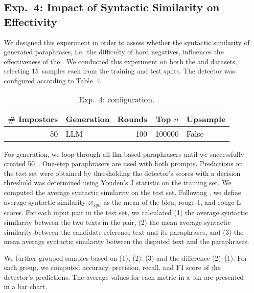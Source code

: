 \subsection{Exp.\ 4: Impact of Syntactic Similarity on \impApprTitle{} Effectivity}
\label{sec:syn_sim_impact_}

We designed this experiment in order to assess whether the syntactic similarity of generated paraphrases, i.e.\ the difficulty of hard negatives, influences the effectiveness of the \impAppr{}.
We conducted this experiment on both the \dataBlog{} and \dataStudent{} datasets, selecting 15~samples each from the training and test splits. 
The detector was configured according to Table~\ref{tab:imp_syn_sim_config}.

\begin{table}[h]
\centering\small
\caption{Exp.\ 4: \impAppr{} configuration.}
\label{tab:imp_syn_sim_config}
\begin{tabular}{@{}rlrrl@{}}   %
\toprule
\# Impostors & Generation & Rounds & Top $n$ & Upsample \\
\midrule
50 & LLM & 100 & \num{100000} & False \\
\bottomrule
\end{tabular}%
\end{table}

For generation, we loop through all \ac{llm}-based paraphrasers until we successfully created 50~\imps{}.
One-step paraphrasers are used with both prompts.
Predictions on the test set were obtained by thresholding the detector’s scores with a decision threshold was determined using Youden’s J statistic on the training set.
We computed the average syntactic similarity on the test set. 
Following \citet{gohsen_captions_2023}, we define average syntactic similarity $\diameter_{syn}$ as the mean of the \ac{bleu}, \ac{rouge}-1, and \ac{rouge}-L scores. 
For each input pair in the test set, we calculated
(1) the average syntactic similarity between the two texts in the pair, (2) the mean average syntactic similarity between the candidate reference text and its paraphrases, and (3) the mean average syntactic similarity between the disputed text and the paraphrases.

We further grouped samples based on (1), (2), (3) and the difference (2)–(1). 
For each group, we computed accuracy, precision, recall, and F1 score of the detector’s predictions. 
The average values for each metric in a bin are presented in a bar chart.

